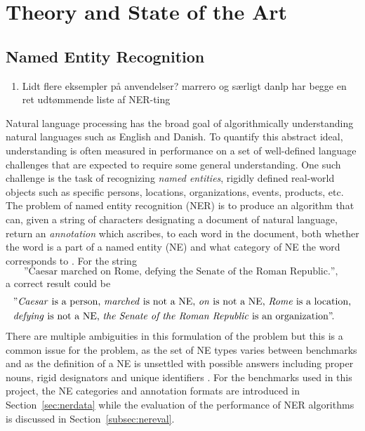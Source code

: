 \documentclass[main.tex]{subfiles}
\begin{document}
\chapter{Theory and State of the Art}
\label{chap:theory}

\section{Named Entity Recognition}
\begin{enumerate}
    \item Lidt flere eksempler på anvendelser? marrero og særligt danlp har begge en ret udtømmende liste af NER-ting
\end{enumerate}
Natural language processing has the broad goal of algorithmically understanding natural languages such as English and Danish.
To quantify this abstract ideal, understanding is often measured in performance on a set of well-defined language challenges that are expected to require some general understanding.
One such challenge is the task of recognizing \emph{named entities}, rigidly defined real-world objects such as specific persons, locations, organizations, events, products, etc.
The problem of named entity recognition (NER) is to produce an algorithm that can, given a string of characters designating a document of natural language, return an \emph{annotation} which ascribes, to each word in the document, both whether the word is a part of a named entity (NE) and what category of NE the word corresponds to \cite{wiki2021ner}.
For the string
\[
    \text{
        ''Caesar marched on Rome, defying the Senate of the Roman Republic.'',
    }
\]
a correct result could be
\begin{align*}
    & \text{
        ''\emph{Caesar} is a person,
        \emph{marched} is not a NE,
        \emph{on} is not a NE,
        \emph{Rome} is a location,
    }\\
    &\text{
        \emph{defying} is not a NE,
        \emph{the Senate of the Roman Republic} is an organization''.
    }
\end{align*}
There are multiple ambiguities in this formulation of the problem but this is a common issue for the problem, as the set of NE types varies between benchmarks and as the definition of a NE is unsettled with possible answers including proper nouns, rigid designators and unique identifiers \cite[Sec. 4]{marrero2013ner}.
For the benchmarks used in this project, the NE categories and annotation formats are introduced in Section~\ref{sec:nerdata} while the evaluation of the performance of NER algorithms is discussed in Section~\ref{subsec:nereval}.
\end{document}
